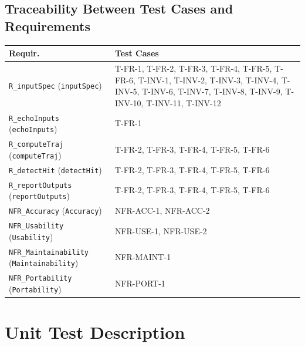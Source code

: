 \documentclass[12pt, titlepage]{article}
\providecommand{\wss}[1]{}
\begin{document}
\subsection{Traceability Between Test Cases and Requirements}

\begin{table}[h!]
\centering
\renewcommand{\arraystretch}{1.15}
\begin{tabular}{p{} p{}}
\toprule
\textbf{Requir.} & \textbf{Test Cases} \\
\midrule
\texttt{R\_inputSpec} (\texttt{inputSpec}) & T-FR-1, T-FR-2, T-FR-3, T-FR-4, T-FR-5, T-FR-6,
                                           T-INV-1, T-INV-2, T-INV-3, T-INV-4, T-INV-5, T-INV-6,
                                           T-INV-7, T-INV-8, T-INV-9, T-INV-10, T-INV-11, T-INV-12 \\
\texttt{R\_echoInputs} (\texttt{echoInputs}) & T-FR-1 \\
\texttt{R\_computeTraj} (\texttt{computeTraj}) & T-FR-2, T-FR-3, T-FR-4, T-FR-5, T-FR-6 \\
\texttt{R\_detectHit} (\texttt{detectHit}) & T-FR-2, T-FR-3, T-FR-4, T-FR-5, T-FR-6 \\
\texttt{R\_reportOutputs} (\texttt{reportOutputs}) & T-FR-2, T-FR-3, T-FR-4, T-FR-5, T-FR-6 \\
\midrule
\texttt{NFR\_Accuracy} (\texttt{Accuracy}) & NFR-ACC-1, NFR-ACC-2 \\
\texttt{NFR\_Usability} (\texttt{Usability}) & NFR-USE-1, NFR-USE-2 \\
\texttt{NFR\_Maintainability} (\texttt{Maintainability}) & NFR-MAINT-1 \\
\texttt{NFR\_Portability} (\texttt{Portability}) & NFR-PORT-1 \\
\bottomrule
\end{tabular}
\label{Table:ReqTrace}
\end{table}

\section{Unit Test Description}\label{Sec:UnitTest}

\wss{This section should not be filled in until after the MIS (detailed design
  document) has been completed.}

\wss{Reference your MIS (detailed design document) and explain your overall
philosophy for test case selection.}  

\wss{To save space and time, it may be an option to provide less detail in this section.  
For the unit tests you can potentially layout your testing strategy here.  That is, you 
can explain how tests will be selected for each module.  For instance, your test building 
approach could be test cases for each access program, including one test for normal behaviour 
and as many tests as needed for edge cases.  Rather than create the details of the input 
and output here, you could point to the unit testing code.  For this to work, you code 
needs to be well-documented, with meaningful names for all of the tests.}
\end{document}

